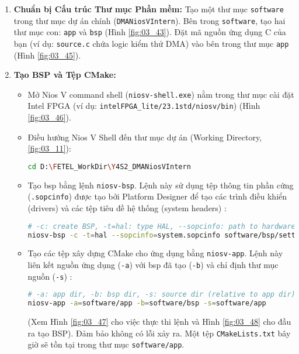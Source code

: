 \begin{enumerate}
    \item \textbf{Chuẩn bị Cấu trúc Thư mục Phần mềm:} Tạo một thư mục \texttt{software} trong thư mục dự án chính (\texttt{DMANiosVIntern}). Bên trong \texttt{software}, tạo hai thư mục con: \texttt{app} và \texttt{bsp} (Hình \ref{fig:03_43}). Đặt mã nguồn ứng dụng C của bạn (ví dụ: \texttt{source.c} chứa logic kiểm thử DMA) vào bên trong thư mục \texttt{app} (Hình \ref{fig:03_45}).
    \item \textbf{Tạo BSP và Tệp CMake:}
    \begin{itemize}
        \item Mở Nios V command shell (\texttt{niosv-shell.exe}) nằm trong thư mục cài đặt Intel FPGA (ví dụ: \texttt{intelFPGA\_lite/23.1std/niosv/bin}) (Hình \ref{fig:03_46}).
        \item Điều hướng Nios V Shell đến thư mục dự án (Working Directory, \ref{fig:03_11}): 
        \begin{lstlisting}[language=bash, caption={Điều hướng trong Nios V Shell}, label=lst:cd_project] 
        cd D:\FETEL_WorkDir\Y4S2_DMANiosVIntern \end{lstlisting}
        \item Tạo \acrshort{bsp} bằng lệnh \texttt{niosv-bsp}. Lệnh này sử dụng tệp thông tin phần cứng (\texttt{.sopcinfo}) được tạo bởi Platform Designer để tạo các trình điều khiển (drivers) và các tệp tiêu đề hệ thống (system headers) \cite{intelNiosVSoftwareDevHandbook}:
        \begin{lstlisting}[language=bash, caption={Lệnh tạo BSP Nios V}, label=lst:gen_bsp]
# -c: create BSP, -t=hal: type HAL, --sopcinfo: path to hardware info
niosv-bsp -c -t=hal --sopcinfo=system.sopcinfo software/bsp/settings.bsp \end{lstlisting}
        \item Tạo các tệp xây dựng CMake cho ứng dụng bằng \texttt{niosv-app}. Lệnh này liên kết nguồn ứng dụng (\texttt{-a}) với \acrshort{bsp} đã tạo (\texttt{-b}) và chỉ định thư mục nguồn (\texttt{-s}) \cite{intelNiosVSoftwareDevHandbook}:
        \begin{lstlisting}[language=bash, caption={Lệnh tạo tệp CMake ứng dụng Nios V}, label=lst:gen_app]
# -a: app dir, -b: bsp dir, -s: source dir (relative to app dir)
niosv-app -a=software/app -b=software/bsp -s=software/app \end{lstlisting}
        (Xem Hình \ref{fig:03_47} cho việc thực thi lệnh và Hình \ref{fig:03_48} cho đầu ra tạo BSP). Đảm bảo không có lỗi xảy ra. Một tệp \texttt{CMakeLists.txt} bây giờ sẽ tồn tại trong thư mục \texttt{software/app}.

\end{itemize}
\end{enumerate}
